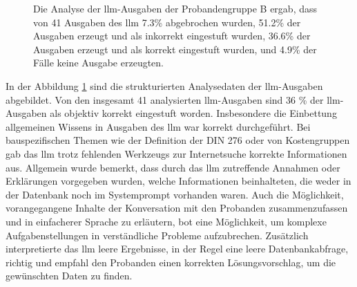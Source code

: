 \begin{figure}[h]
\begin{tikzpicture}
\end{tikzpicture}
\caption[Gesamtergebnisse der \gls{llm}-Auswertung]{Die Analyse der \gls{llm}-Ausgaben der Probandengruppe B ergab, dass von 41 Ausgaben des \gls{llm} 7.3\% abgebrochen wurden, 51.2\% der Ausgaben erzeugt und als inkorrekt eingestuft wurden, 36.6\% der Ausgaben erzeugt und als korrekt eingestuft wurden, und 4.9\% der Fälle keine Ausgabe erzeugten.}
\label{fig:104_results-ai}
\end{figure}

In der Abbildung \ref{fig:104_results-ai} sind die strukturierten Analysedaten der \gls{llm}-Ausgaben abgebildet. 
Von den insgesamt 41 analysierten \gls{llm}-Ausgaben sind 36 \% der \gls{llm}-Ausgaben als objektiv korrekt eingestuft worden. 
Insbesondere die Einbettung allgemeinen Wissens in Ausgaben des \gls{llm} war korrekt durchgeführt.
Bei bauspezifischen Themen wie der Definition der DIN 276 oder von Kostengruppen gab das \gls{llm} trotz fehlenden Werkzeugs zur Internetsuche korrekte Informationen aus.
Allgemein wurde bemerkt, dass durch das \gls{llm} zutreffende Annahmen oder Erklärungen vorgegeben wurden,
welche Informationen beinhalteten, die weder in der Datenbank noch im Systemprompt vorhanden waren.
Auch die Möglichkeit, vorangegangene Inhalte der Konversation mit den Probanden zusammenzufassen und in einfacherer Sprache zu erläutern, bot eine Möglichkeit,
um komplexe Aufgabenstellungen in verständliche Probleme aufzubrechen. Zusätzlich interpretierte das \gls{llm} leere Ergebnisse, in der Regel eine leere Datenbankabfrage,
richtig und empfahl den Probanden einen korrekten Lösungsvorschlag, um die gewünschten Daten zu finden. \\


